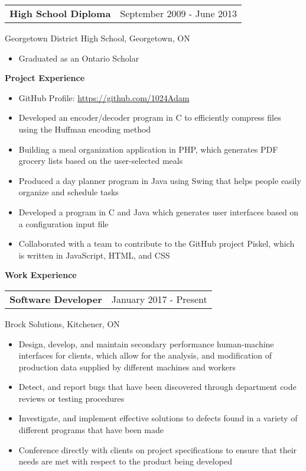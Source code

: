 \documentclass[12pt]{article}
\newcommand{\doublespace}{\vspace{8pt}}
\begin{document}
\doublespace

{
  \small
  \noindent\begin{tabu} {@{} X[l] X[r]}
    \textbf{High School Diploma} & September 2009 - June 2013
  \end{tabu}
  Georgetown District High School, Georgetown, ON
  \begin{itemize}
    \item Graduated as an Ontario Scholar
  \end{itemize}
}

\doublespace

\textbf{Project Experience}

\doublespace

{
  \small
  \begin{itemize}
    \item GitHub Profile: \href{https://github.com/1024Adam}{https://github.com/1024Adam}
    \item Developed an encoder/decoder program in C to efficiently compress files using the Huffman encoding method
    \item Building a meal organization application in PHP, which generates PDF grocery lists based on the user-selected meals
    \item Produced a day planner program in Java using Swing that helps people easily organize and schedule tasks
    \item Developed a program in C and Java which generates user interfaces based on a configuration input file
    \item Collaborated with a team to contribute to the GitHub project Piskel, which is written in JavaScript, HTML, and CSS
  \end{itemize}
}

\newpage
\pagestyle{normal}

\textbf{Work Experience}

\doublespace

{
  \small
  \noindent\begin{tabu} {@{} X[l] X[r]}
    \textbf{Software Developer} & January 2017 - Present
  \end{tabu}
  Brock Solutions, Kitchener, ON
  \begin{itemize}
    \item Design, develop, and maintain secondary performance human-machine interfaces for clients, which allow for the analysis, and modification of production data supplied by different machines and workers
    \item Detect, and report bugs that have been discovered through department code reviews or testing procedures 
    \item Investigate, and implement effective solutions to defects found in a variety of different programs that have been made
    \item Conference directly with clients on project specifications to ensure that their needs are met with respect to the product being developed
  \end{itemize}
}
\end{document}
